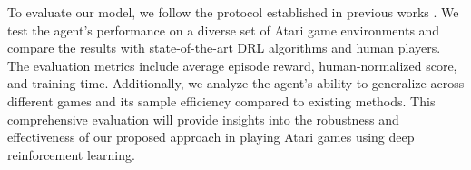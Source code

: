 To evaluate our model, we follow the protocol established in previous works \cite{1708.05866}. We test the agent's performance on a diverse set of Atari game environments and compare the results with state-of-the-art DRL algorithms and human players. The evaluation metrics include average episode reward, human-normalized score, and training time. Additionally, we analyze the agent's ability to generalize across different games and its sample efficiency compared to existing methods. This comprehensive evaluation will provide insights into the robustness and effectiveness of our proposed approach in playing Atari games using deep reinforcement learning.